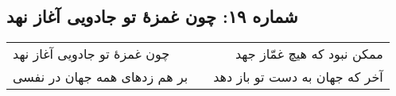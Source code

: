 \begin{center}
\section*{شماره ۱۹: چون غمزۀ تو جادویی آغاز نهد}
\label{sec:019}
\begin{longtable}{l p{0.5cm} r}
چون غمزهٔ تو جادویی آغاز نهد
&&
ممکن نبود که هیچ غمّاز جهد
\\
بر هم زدهای همه جهان در نفسی
&&
آخر که جهان به دست تو باز دهد
\\
\end{longtable}
\end{center}
